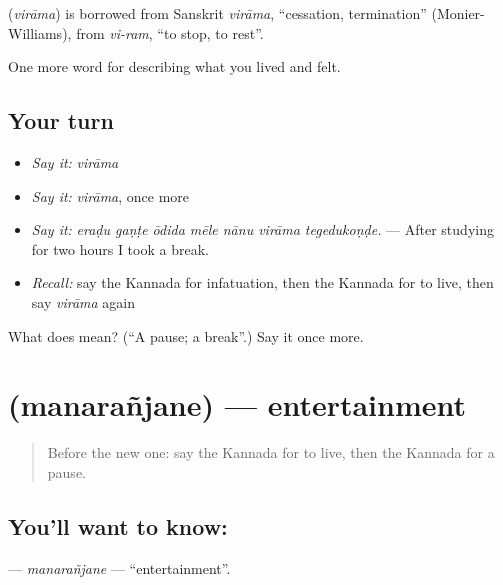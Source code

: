 \begin{cousinweb}
\textbf{} (\emph{virāma}) is borrowed from Sanskrit \emph{virāma}, \textquotedblleft{}cessation, termination\textquotedblright{} (Monier-Williams), from \emph{vi-ram}, \textquotedblleft{}to stop, to rest\textquotedblright{}.
\end{cousinweb}

\begin{grammarlens}[title={What you've built}]
One more word for describing what you lived and felt.
\end{grammarlens}

\subsection*{Your turn}
\begin{itemize}
\raggedright
  \item \emph{Say it:} \emph{virāma}
  \item \emph{Say it:} \emph{virāma}, once more
  \item \emph{Say it:} \emph{eraḍu gaṇṭe ōdida mēle nānu virāma tegedukoṇḍe.} — After studying for two hours I took a break.
  \item \emph{Recall:} say the Kannada for infatuation, then the Kannada for to live, then say \emph{virāma} again
\end{itemize}

\begin{tcolorbox}[breakable,colback=teal!4,colframe=teal!35!black,title={Before you move on}]
What does  mean? (\textquotedblleft{}A pause; a break\textquotedblright{}.) Say it once more.
\end{tcolorbox}
\section[\texorpdfstring{\kn{ಮನರಂಜನೆ} (manarañjane)}{ಮನರಂಜನೆ (manarañjane)}]{ (manarañjane) — entertainment}

\label{lesson:KA-C530-manaranjane}



\begin{quote}
Before the new one: say the Kannada for to live, then the Kannada for a pause.
\end{quote}

\subsection*{You'll want to know: }
\textbf{} — \emph{manarañjane} — \textquotedblleft{}entertainment\textquotedblright{}.

